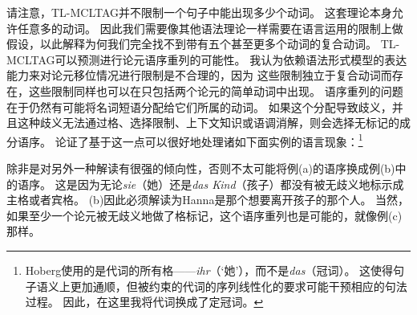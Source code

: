请注意，TL-MCLTAG并不限制一个句子中能出现多少个动词。
这套理论本身允许任意多的动词。
因此我们需要像其他语法理论一样需要在语言运用的限制上做假设，以此解释为何我们完全找不到带有五个甚至更多个动词的复合动词。
TL-MCLTAG可以预测进行论元语序重列的可能性。
我认为依赖语法形式模型的表达能力来对论元移位情况进行限制是不合理的，因为
这些限制独立于复合动词而存在，这些限制同样也可以在只包括两个论元的简单动词中出现。
语序重列的问题在于仍然有可能将名词短语分配给它们所属的动词。
如果这个分配导致歧义，并且这种歧义无法通过格、选择限制、上下文知识或语调消解，则会选择无标记的成分语序。
\citet*[]{Hoberg81a}论证了基于这一点可以很好地处理诸如下面实例的语言现象：\footnote{        
Hoberg使用的是代词的所有格——\emph{ihr}（`她'），而不是\emph{das}（冠词）。
这使得句子语义上更加通顺，但被约束的代词的序列线性化的要求可能干预相应的句法过程。
因此，在这里我将代词换成了定冠词。
}
\eal
\judgewidth{\#}
\zl
\pagebreak

\noindent
除非是对另外一种解读有很强的倾向性，否则不太可能将例(a)的语序换成例(b)中的语序。
这是因为无论\emph{sie}（她）还是\emph{das Kind}（孩子）都没有被无歧义地标示成主格或者宾格。
(b)因此必须解读为Hanna是那个想要离开孩子的那个人。
当然，如果至少一个论元被无歧义地做了格标记，这个语序重列也是可能的，就像例(c)那样。

